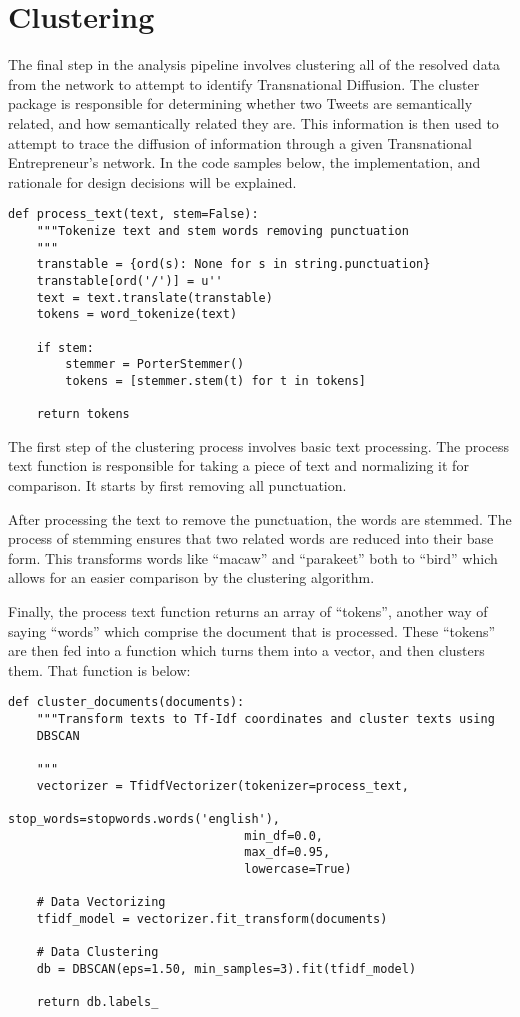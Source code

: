 \section{Clustering}
The final step in the analysis pipeline involves clustering all of the
resolved data from the network to attempt to identify Transnational
Diffusion. The cluster package is responsible for determining whether
two Tweets are semantically related, and how semantically related they
are. This information is then used to attempt to trace the diffusion
of information through a given Transnational Entrepreneur's
network. In the code samples below, the implementation, and rationale
for design decisions will be explained.

\begin{lstlisting}
def process_text(text, stem=False):
    """Tokenize text and stem words removing punctuation
    """
    transtable = {ord(s): None for s in string.punctuation}
    transtable[ord('/')] = u''
    text = text.translate(transtable)
    tokens = word_tokenize(text)
    
    if stem:
        stemmer = PorterStemmer()
        tokens = [stemmer.stem(t) for t in tokens]
    
    return tokens
\end{lstlisting}

The first step of the clustering process involves basic text
processing.  The process text function is responsible for taking a
piece of text and normalizing it for comparison. It starts by first
removing all punctuation.

After processing the text to remove the punctuation, the words are
stemmed. The process of stemming ensures that two related words are
reduced into their base form. This transforms words like ``macaw'' and
``parakeet'' both to ``bird'' which allows for an easier comparison
by the clustering algorithm.

Finally, the process text function returns an array of ``tokens'',
another way of saying ``words'' which comprise the document that is
processed. These ``tokens'' are then fed into a function which turns
them into a vector, and then clusters them. That function is below:
  
\begin{lstlisting}
def cluster_documents(documents):
    """Transform texts to Tf-Idf coordinates and cluster texts using
    DBSCAN
    
    """
    vectorizer = TfidfVectorizer(tokenizer=process_text,
                                 stop_words=stopwords.words('english'),
                                 min_df=0.0,
                                 max_df=0.95,
                                 lowercase=True)
    
    # Data Vectorizing
    tfidf_model = vectorizer.fit_transform(documents)
    
    # Data Clustering
    db = DBSCAN(eps=1.50, min_samples=3).fit(tfidf_model)
    
    return db.labels_
\end{lstlisting}

